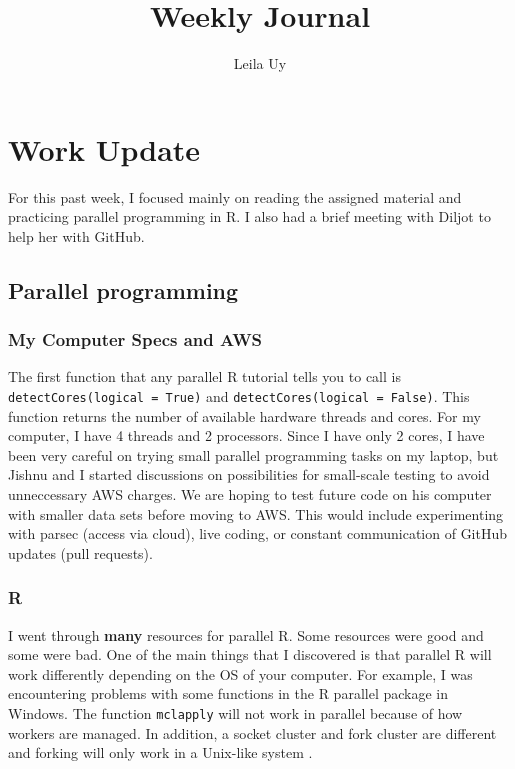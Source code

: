 \documentclass[a4paper,10pt]{article}
\title{Weekly Journal}
\author{Leila Uy}
\begin{document}
\maketitle

% 

\section{Work Update}

For this past week, I focused mainly on reading the assigned material and practicing parallel programming in R. I also had a brief meeting with Diljot to help her with GitHub.

\subsection{Parallel programming}

\subsubsection{My Computer Specs and AWS}
The first function that any parallel R tutorial tells you to call is \verb|detectCores(logical = True)| and \verb|detectCores(logical = False)|.
This function returns the number of available hardware threads and cores. For my computer, I have 4 threads and 2 processors. Since I have only 
2 cores, I have been very careful on trying small parallel programming tasks on my laptop, but Jishnu and I started discussions on possibilities 
for small-scale testing to avoid unneccessary AWS charges. We are hoping to test future code on his computer with smaller data sets before 
moving to AWS. This would include experimenting with parsec (access via cloud), live coding, or constant communication of GitHub updates 
(pull requests). 

\subsubsection{R}
I went through \textbf{many} resources for parallel R. Some resources were good \cite{gera2020, hallquist2018, martius2020, tinakarimi2020} 
and some were bad. One of the main things that I discovered is that parallel R will work differently depending on the OS of your computer. For example, I was encountering problems with some functions 
in the R parallel package in Windows. The function \verb|mclapply| will not work in parallel because of how workers are managed. In addition, 
a socket cluster and fork cluster are different and forking will only work in a Unix-like system \cite{hallquist2018}.
\end{document}
